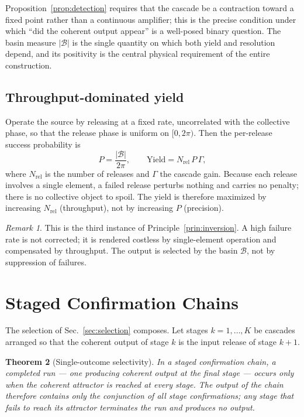 \documentclass[twocolumn,10pt,a4paper]{article}
\theoremstyle{thmstyle}
\newtheorem{theorem}{Theorem}[section]
\theoremstyle{definition}
\theoremstyle{remark}
\newtheorem{remark}[theorem]{Remark}
\begin{document}
Proposition~\ref{prop:detection} requires that the cascade be a contraction
toward a fixed point rather than a continuous amplifier; this is the precise
condition under which ``did the coherent output appear'' is a well-posed
binary question. The basin measure $|\mathcal{B}|$ is the single quantity on
which both yield and resolution depend, and its positivity is the central
physical requirement of the entire construction.

\subsection{Throughput-dominated yield}

Operate the source by releasing at a fixed rate, uncorrelated with the
collective phase, so that the release phase is uniform on $[0,2\pi)$. Then
the per-release success probability is
\begin{equation}
P = \frac{|\mathcal{B}|}{2\pi},
\qquad
\text{Yield} = N_{\mathrm{rel}}\,P\,\Gamma,
\label{eq:yield}
\end{equation}
where $N_{\mathrm{rel}}$ is the number of releases and $\Gamma$ the cascade
gain. Because each release involves a single element, a failed release
perturbs nothing and carries no penalty; there is no collective object to
spoil. The yield is therefore maximized by increasing $N_{\mathrm{rel}}$
(throughput), not by increasing $P$ (precision).

\begin{remark}
This is the third instance of Principle~\ref{prin:inversion}. A high failure
rate is not corrected; it is rendered costless by single-element operation and
compensated by throughput. The output is selected by the basin
$\mathcal{B}$, not by suppression of failures.
\end{remark}

\section{Staged Confirmation Chains}
\label{sec:chains}

The selection of Sec.~\ref{sec:selection} composes. Let stages
$k=1,\dots,K$ be cascades arranged so that the coherent output of stage $k$ is
the input release of stage $k+1$.

\begin{theorem}[Single-outcome selectivity]
\label{thm:chain}
In a staged confirmation chain, a completed run --- one producing coherent
output at the final stage --- occurs only when the coherent attractor is
reached at every stage. The output of the chain therefore contains only the
conjunction of all stage confirmations; any stage that fails to reach its
attractor terminates the run and produces no output.
\end{theorem}
\end{document}
